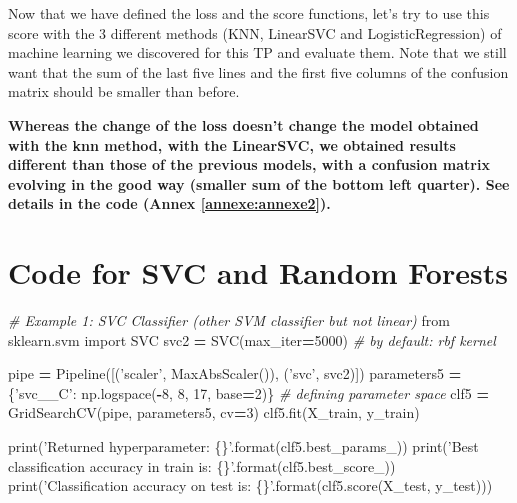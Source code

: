 \documentclass[10pt,a4paper]{article}
\newenvironment{Shaded}{\begin{snugshade}}{\end{snugshade}}
\newcommand{\BuiltInTok}[1]{#1}
\newcommand{\CommentTok}[1]{\textcolor[rgb]{0.56,0.35,0.01}{\textit{#1}}}
\newcommand{\DecValTok}[1]{\textcolor[rgb]{0.00,0.00,0.81}{#1}}
\newcommand{\ImportTok}[1]{#1}
\newcommand{\NormalTok}[1]{#1}
\newcommand{\OperatorTok}[1]{\textcolor[rgb]{0.81,0.36,0.00}{\textbf{#1}}}
\newcommand{\SpecialCharTok}[1]{\textcolor[rgb]{0.00,0.00,0.00}{#1}}
\newcommand{\StringTok}[1]{\textcolor[rgb]{0.31,0.60,0.02}{#1}}
\theoremstyle{break}
\begin{document}
Now that we have defined the loss and the score functions, let's try to use this score with the 3 different methods (KNN, LinearSVC and LogisticRegression) of machine learning we discovered for this TP and evaluate them. Note that we still want that the sum of the last five lines and the first five columns of the confusion matrix should be smaller than before.

\textbf{\faArrowCircleRight{} Whereas the change of the loss doesn't change the model obtained with the knn method, with the LinearSVC, we obtained results different than those of the previous models, with a confusion matrix evolving in the good way (smaller sum of the bottom left quarter). See details in the code (Annex \ref{annexe:annexe2}).}

\clearpage

\newpage

\hypertarget{appendix-appendix}{%
\appendix}


\setcounter{page}{0}

\hypertarget{annexe:annexe1}{%
\section{Code for SVC and Random Forests}\label{annexe:annexe1}}

\begin{Shaded}
\begin{Highlighting}[]
\CommentTok{# Example 1: SVC Classifier (other SVM classifier but not linear)}
\ImportTok{from}\NormalTok{ sklearn.svm }\ImportTok{import}\NormalTok{ SVC}
\NormalTok{svc2 }\OperatorTok{=}\NormalTok{ SVC(max_iter}\OperatorTok{=}\DecValTok{5000}\NormalTok{) }\CommentTok{# by default: rbf kernel}

\NormalTok{pipe }\OperatorTok{=}\NormalTok{ Pipeline([(}\StringTok{'scaler'}\NormalTok{, MaxAbsScaler()), (}\StringTok{'svc'}\NormalTok{, svc2)])}
\NormalTok{parameters5 }\OperatorTok{=}\NormalTok{ \{}\StringTok{'svc__C'}\NormalTok{: np.logspace(}\OperatorTok{-}\DecValTok{8}\NormalTok{, }\DecValTok{8}\NormalTok{, }\DecValTok{17}\NormalTok{, base}\OperatorTok{=}\DecValTok{2}\NormalTok{)\} }\CommentTok{# defining parameter space}
\NormalTok{clf5 }\OperatorTok{=}\NormalTok{ GridSearchCV(pipe, parameters5, cv}\OperatorTok{=}\DecValTok{3}\NormalTok{)}
\NormalTok{clf5.fit(X_train, y_train)}

\BuiltInTok{print}\NormalTok{(}\StringTok{'Returned hyperparameter: }\SpecialCharTok{\{\}}\StringTok{'}\NormalTok{.}\BuiltInTok{format}\NormalTok{(clf5.best_params_))}
\BuiltInTok{print}\NormalTok{(}\StringTok{'Best classification accuracy in train is: }\SpecialCharTok{\{\}}\StringTok{'}\NormalTok{.}\BuiltInTok{format}\NormalTok{(clf5.best_score_))}
\BuiltInTok{print}\NormalTok{(}\StringTok{'Classification accuracy on test is: }\SpecialCharTok{\{\}}\StringTok{'}\NormalTok{.}\BuiltInTok{format}\NormalTok{(clf5.score(X_test, y_test)))}
\end{Highlighting}
\end{Shaded}
\end{document}
